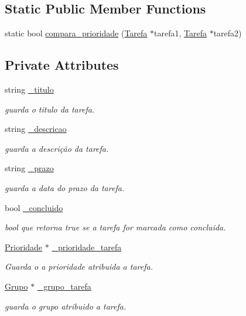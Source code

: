 \subsection*{Static Public Member Functions}
\begin{DoxyCompactItemize}
\item 
static bool \hyperlink{classTarefa_aced2ea3f6ece755a69d49d58a8f51bbf}{compara\+\_\+prioridade} (\hyperlink{classTarefa}{Tarefa} $\ast$tarefa1, \hyperlink{classTarefa}{Tarefa} $\ast$tarefa2)
\end{DoxyCompactItemize}
\subsection*{Private Attributes}
\begin{DoxyCompactItemize}
\item 
string \hyperlink{classTarefa_a2ff0165cde44ccf91162eeb22edb2c4d}{\+\_\+titulo}
\begin{DoxyCompactList}\small\item\em guarda o titulo da tarefa. \end{DoxyCompactList}\item 
string \hyperlink{classTarefa_acc9dffa5eb12b46370e67b32b96863f2}{\+\_\+descricao}
\begin{DoxyCompactList}\small\item\em guarda a descrição da tarefa. \end{DoxyCompactList}\item 
string \hyperlink{classTarefa_a4836ad542cc73ff37b4473587fc630cd}{\+\_\+prazo}
\begin{DoxyCompactList}\small\item\em guarda a data do prazo da tarefa. \end{DoxyCompactList}\item 
bool \hyperlink{classTarefa_a02764495d093d388ec2fb21c0bde3603}{\+\_\+concluido}
\begin{DoxyCompactList}\small\item\em bool que retorna true se a tarefa for marcada como concluida. \end{DoxyCompactList}\item 
\hyperlink{classPrioridade}{Prioridade} $\ast$ \hyperlink{classTarefa_a2f41a39b7098d77a1e1773cb1a4177d4}{\+\_\+prioridade\+\_\+tarefa}
\begin{DoxyCompactList}\small\item\em Guarda o a prioridade atribuida a tarefa. \end{DoxyCompactList}\item 
\hyperlink{classGrupo}{Grupo} $\ast$ \hyperlink{classTarefa_a54326411de197afb5a6f8d98d109e840}{\+\_\+grupo\+\_\+tarefa}
\begin{DoxyCompactList}\small\item\em guarda o grupo atribuido a tarefa. \end{DoxyCompactList}\end{DoxyCompactItemize}


